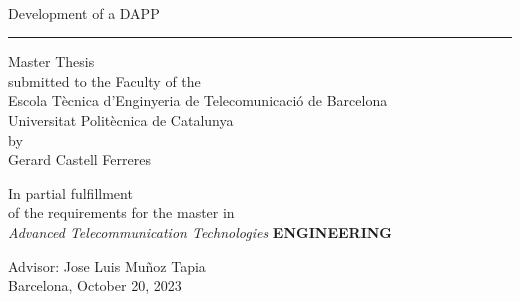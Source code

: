 \documentclass[a4paper,12pt]{article}
\begin{document}
\thispagestyle{empty}
\begin{center}
{\sffamily 
{}\\
\vspace{1cm}
{\Huge Development of a DAPP}\\
\vspace{0.5cm}
{\color{black}\hrule height 1pt}
\vspace{1cm}
{\large{Master Thesis\\
submitted to the Faculty of the \\
Escola T\`ecnica d'Enginyeria de Telecomunicaci\'o de Barcelona \\
Universitat Polit\`ecnica de Catalunya \\
by\\
\vspace{0.4cm}
Gerard Castell Ferreres}}

\nocite{*} %

\vspace{1.5cm}

{In partial fulfillment\\
of the requirements for the master in\\
\textit{Advanced Telecommunication Technologies} \textbf{ENGINEERING}}

\vspace{2cm}

{{Advisor: Jose Luis Muñoz Tapia}} \\
{{Barcelona, October 20, 2023}}
\thispagestyle{alim}
}

\end{center}
\newpage
\tableofcontents

\newpage
\listoffigures
\listoftables
\end{document}
